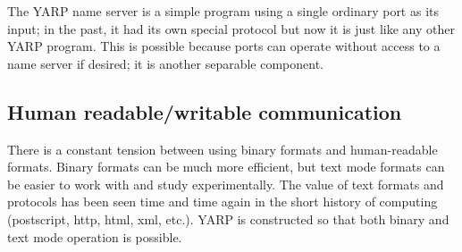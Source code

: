 The YARP name server is a simple program using a single ordinary
port as its input; in the past, it had its own special protocol but
now it is just like any other YARP program.  This is possible 
because ports can operate without access to a name server if
desired; it is another separable component.






\subsection{Human readable/writable communication}

There is a constant tension between using binary formats and
human-readable formats.  Binary formats can be much more efficient,
but text mode formats can be easier to work with and study
experimentally.  The value of text formats and
protocols has been seen time and time again in the short history of
computing (postscript, http, html, xml, etc.).
YARP is constructed so that both binary and text mode operation
is possible.

